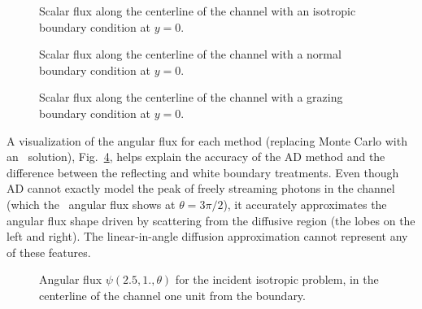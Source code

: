 \begin{figure}[htb]
  \centering\small
  \hspace{-.5in}
  
  \hspace{-.5in}
  \caption{Scalar flux along the centerline of the channel with an isotropic
  boundary condition at $y=0$.}
  \label{fig:bcChannelIsotropic}
\end{figure}

\begin{figure}[htb]
  \centering\small
  \hspace{-.5in}
  
  \hspace{-.5in}
  \caption{Scalar flux along the centerline of the channel with a normal
  boundary condition at $y=0$.}
  \label{fig:bcChannelDelta}
\end{figure}

\begin{figure}[htb]
  \centering\small
  \hspace{-.5in}
  
  \hspace{-.5in}
  \caption{Scalar flux along the centerline of the channel with a grazing
  boundary condition at $y=0$.}
  \label{fig:bcChannelGrazing}
\end{figure}

A visualization of the angular flux for each method (replacing Monte Carlo with
an \SN\ solution), Fig.~\ref{fig:bcChannelIsotropicAngular}, helps explain the
accuracy
of the AD method and the difference between the reflecting and white boundary
treatments. Even though AD cannot exactly model the peak of freely streaming
photons in the channel (which the \SN\ angular flux shows at $\theta=3\pi/2$),
it accurately approximates the angular flux shape driven by scattering from the
diffusive region (the lobes on the left and right).
The linear-in-angle diffusion approximation cannot represent any of these
features.  

\begin{figure}[htb!]
  \centering\small
  \vspace{-.25in}
  \hspace{-.5in}
  
  \hspace{-.5in}
  \vspace{-.25in}
  \caption{Angular flux $\psi(2.5, 1., \theta)$ for the incident isotropic
  problem, in the centerline of the channel one unit from the boundary.}
  \label{fig:bcChannelIsotropicAngular}
\end{figure}

